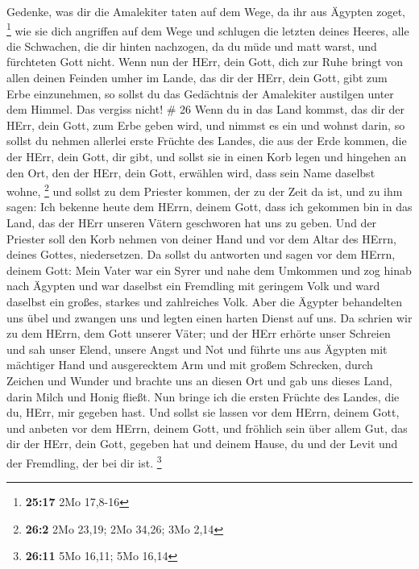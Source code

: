  Gedenke, was dir die Amalekiter taten auf dem Wege, da ihr
aus Ägypten zoget, \footnote{\textbf{25:17} 2Mo 17,8-16} 
wie sie dich angriffen auf dem Wege und schlugen die letzten deines
Heeres, alle die Schwachen, die dir hinten nachzogen, da du müde und
matt warst, und fürchteten Gott nicht.  Wenn nun der HErr,
dein Gott, dich zur Ruhe bringt von allen deinen Feinden umher im Lande,
das dir der HErr, dein Gott, gibt zum Erbe einzunehmen, so sollst du das
Gedächtnis der Amalekiter austilgen unter dem Himmel. Das vergiss nicht!
\# 26  Wenn du in das Land kommst, das dir der HErr, dein
Gott, zum Erbe geben wird, und nimmst es ein und wohnst darin,
 so sollst du nehmen allerlei erste Früchte des Landes, die
aus der Erde kommen, die der HErr, dein Gott, dir gibt, und sollst sie
in einen Korb legen und hingehen an den Ort, den der HErr, dein Gott,
erwählen wird, dass sein Name daselbst wohne, \footnote{\textbf{26:2}
  2Mo 23,19; 2Mo 34,26; 3Mo 2,14}  und sollst zu dem
Priester kommen, der zu der Zeit da ist, und zu ihm sagen: Ich bekenne
heute dem HErrn, deinem Gott, dass ich gekommen bin in das Land, das der
HErr unseren Vätern geschworen hat uns zu geben.  Und der
Priester soll den Korb nehmen von deiner Hand und vor dem Altar des
HErrn, deines Gottes, niedersetzen.  Da sollst du antworten
und sagen vor dem HErrn, deinem Gott: Mein Vater war ein Syrer und nahe
dem Umkommen und zog hinab nach Ägypten und war daselbst ein Fremdling
mit geringem Volk und ward daselbst ein großes, starkes und zahlreiches
Volk.  Aber die Ägypter behandelten uns übel und zwangen uns
und legten einen harten Dienst auf uns.  Da schrien wir zu
dem HErrn, dem Gott unserer Väter; und der HErr erhörte unser Schreien
und sah unser Elend, unsere Angst und Not  und führte uns
aus Ägypten mit mächtiger Hand und ausgerecktem Arm und mit großem
Schrecken, durch Zeichen und Wunder  und brachte uns an
diesen Ort und gab uns dieses Land, darin Milch und Honig fließt.
 Nun bringe ich die ersten Früchte des Landes, die du,
HErr, mir gegeben hast. Und sollst sie lassen vor dem HErrn, deinem
Gott, und anbeten vor dem HErrn, deinem Gott,  und fröhlich
sein über allem Gut, das dir der HErr, dein Gott, gegeben hat und deinem
Hause, du und der Levit und der Fremdling, der bei dir ist. \footnote{\textbf{26:11}
  5Mo 16,11; 5Mo 16,14}

